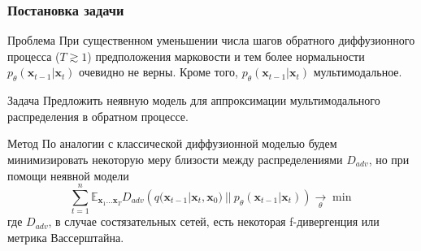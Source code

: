 \documentclass[8pt]{beamer}
\begin{document}
\begin{frame}
\end{frame}

\begin{frame}
	\frametitle{Постановка задачи}
		\begin{block}{Проблема}
			При существенном уменьшении числа шагов обратного диффузионного процесса ($T\gtrsim 1$) предположения марковости и тем более нормальности $p_\theta(\textbf{x}_{t-1}|\textbf{x}_t)$ очевидно не верны. Кроме того, $p_\theta(\textbf{x}_{t-1}|\textbf{x}_t)$ мультимодальное.
		\end{block}
	
		\begin{block}{Задача}
			Предложить неявную модель для аппроксимации мультимодального распределения в обратном процессе. 
		\end{block}
	
	\begin{block}{Метод}
			По аналогии с классической диффузионной моделью будем минимизировать некоторую меру близости между распределениями $D_{adv}$, но при помощи неявной модели
			 \begin{equation*}
			\sum\limits_{t=1}^n \mathbb{E}_{\textbf{x}_1\dots \textbf{x}_T} D_{adv}\left(q(\textbf{x}_{t-1}|\textbf{x}_t, \textbf{x}_0)~||~p_\theta(\textbf{x}_{t-1}|\textbf{x}_t)  \right) \xrightarrow[\theta]{}\min
		\end{equation*}
			где $D_{adv}$, в случае состязательных сетей, есть некоторая f-дивергенция или метрика Вассерштайна.
		\end{block}

\end{frame}
\end{document}

